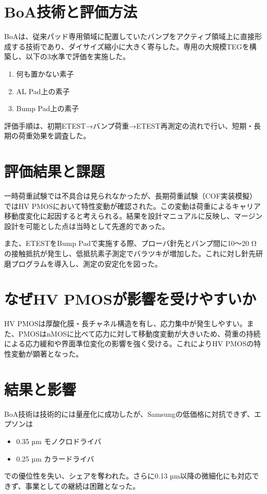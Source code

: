 \documentclass[conference]{IEEEtran}
\begin{document}
\section{BoA技術と評価方法}
BoAは、従来パッド専用領域に配置していたバンプをアクティブ領域上に直接形成する技術であり、ダイサイズ縮小に大きく寄与した。専用の大規模TEGを構築し、以下の3水準で評価を実施した。
\begin{enumerate}
  \item 何も置かない素子
  \item AL Pad上の素子
  \item Bump Pad上の素子
\end{enumerate}

評価手順は、初期ETEST→バンプ荷重→ETEST再測定の流れで行い、短期・長期の荷重効果を調査した。

\section{評価結果と課題}
一時荷重試験では不具合は見られなかったが、長期荷重試験（COF実装模擬）ではHV PMOSにおいて特性変動が確認された。この変動は荷重によるキャリア移動度変化に起因すると考えられる。結果を設計マニュアルに反映し、マージン設計を可能とした点は当時として先進的であった。

また、ETESTをBump Padで実施する際、プローバ針先とバンプ間に10〜20 Ωの接触抵抗が発生し、低抵抗素子測定でバラツキが増加した。これに対し針先研磨プログラムを導入し、測定の安定化を図った。

\section{なぜHV PMOSが影響を受けやすいか}
HV PMOSは厚酸化膜・長チャネル構造を有し、応力集中が発生しやすい。また、PMOSはnMOSに比べて応力に対して移動度変動が大きいため、荷重の持続による応力緩和や界面準位変化の影響を強く受ける。これによりHV PMOSの特性変動が顕著となった。

\section{結果と影響}
BoA技術は技術的には量産化に成功したが、Samsungの低価格に対抗できず、エプソンは
\begin{itemize}
  \item 0.35 µm モノクロドライバ
  \item 0.25 µm カラードライバ
\end{itemize}
での優位性を失い、シェアを奪われた。さらに0.13 µm以降の微細化にも対応できず、事業としての継続は困難となった。
\end{document}
